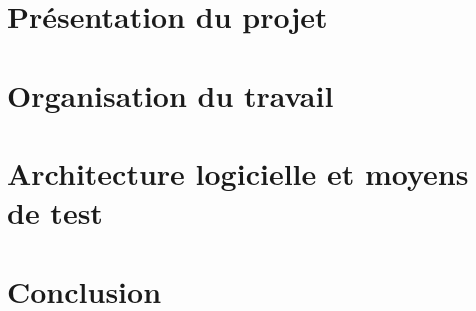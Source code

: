\documentclass[a4paper,11pt]{article}
\begin{document}
\pagestyle{plain}


\makeTitlePage %

\clearpage

\selectfont

\begin{Large}
\tableofcontents
\end{Large}

\clearpage

\section{Présentation du projet}


\section{Organisation du travail}


\section{Architecture logicielle et moyens de test}


\section{Conclusion}


\makeAbstractPage
\pagestyle{empty}
\end{document}
